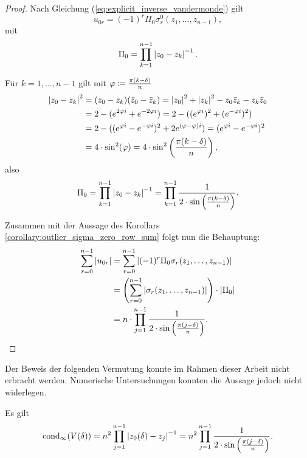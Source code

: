 \begin{proof}
    Nach Gleichung (\ref{eq:explicit_inverse_vandermonde}) gilt
    \[
        u_{0r} = (-1)^{r} \Pi_0 \sigma_{r}^{0}(z_1, \dots, z_{n-1}),
    \]
    mit
    \[
        \Pi_0 = \prod_{k=1}^{n-1} \abs{ z_0 - z_k }^{-1}.
    \]

    \noindent Für $k = 1,\dots,n-1$ gilt mit $\varphi \defeq \frac{\pi (k - \delta)}{n}$
    \[
        \begin{split}
            \abs{z_0 - z_k}^2
            &= (z_0 - z_k) (\conj{z}_0 - \conj{z}_k)
            = \abs{z_0}^2 + \abs{z_k}^2 - z_0\conj{z}_k - z_k\conj{z}_0\\
            &= 2 - (e^{2 \varphi i} + e^{-2 \varphi i})
            = 2 - ((e^{\varphi i})^2 + (e^{-\varphi i})^2)\\
            &= 2 - ( (e^{\varphi i} - e^{-\varphi i})^2 + 2 e^{(\varphi - \varphi) i})
            = (e^{\varphi i} - e^{-\varphi i})^2\\
            &= 4 \cdot \sin^2 (\varphi)
            = 4 \cdot \sin^2 \left( \frac{\pi (k-\delta)}{n} \right),
        \end{split}
    \]
    also
    \[
        \Pi_0
        = \prod_{\substack{k = 1}}^{n-1} \abs{ z_0 - z_k }^{-1}
        = \prod_{\substack{k = 1}}^{n-1} \frac{1}{2 \cdot \sin \left( \frac{\pi (k-\delta)}{n} \right)}.
    \]

    \noindent Zusammen mit der Aussage des Korollars \ref{corollary:outlier_sigma_zero_row_sum} folgt nun die Behauptung:
    \[
        \begin{split}
            \sum_{r=0}^{n-1} \abs{ u_{0r} }
            &= \sum_{r=0}^{n-1} \abs{ (-1)^{r} \Pi_0 \sigma_{r}(z_1, \dots, z_{n-1}) }\\
            &= \left( \sum_{r=0}^{n-1} \abs{ \sigma_{r}(z_1, \dots, z_{n-1}) } \right) \cdot \abs{\Pi_0}\\
            &= n \cdot \prod_{j=1}^{n-1} \frac{1}{2 \cdot \sin \left(\frac{\pi (j - \delta)}{n} \right)}.
        \end{split}
    \]
\end{proof}

Der Beweis der folgenden Vermutung konnte im Rahmen dieser Arbeit nicht
erbracht werden. Numerische Untersuchungen konnten die Aussage jedoch nicht
widerlegen.

\begin{assumption}
    Es gilt
    \begin{equation}
        \cond[\infty]{ \Vand{\delta} }
        = n^2 \prod_{j=1}^{n-1} \abs{ z_0(\delta) - z_j }^{-1}
        = n^2 \prod_{j=1}^{n-1} \frac{1}{2 \cdot \sin \left(\frac{\pi (j - \delta)}{n} \right)}.
    \end{equation}
\end{assumption}

